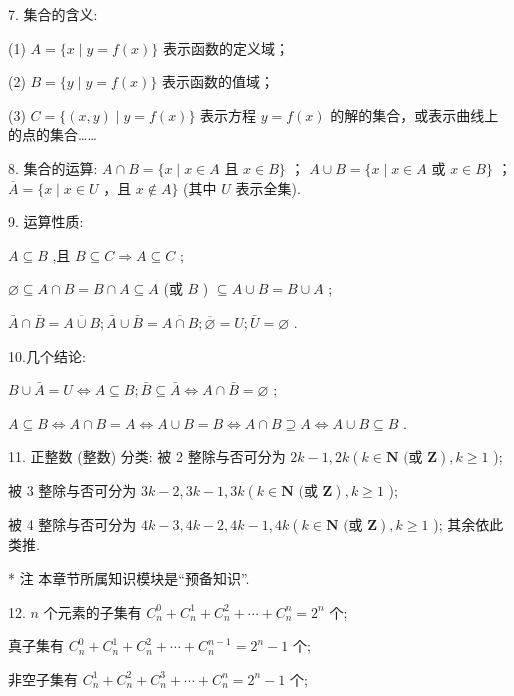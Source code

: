 7. 集合的含义:

(1) $A = \{ x \mid  y = f\left( x\right) \}$ 表示函数的定义域；

(2) $B = \{ y \mid  y = f\left( x\right) \}$ 表示函数的值域；

(3) $C = \{ \left( {x,y}\right)  \mid  y = f\left( x\right) \}$ 表示方程 $y = f\left( x\right)$ 的解的集合，或表示曲线上的点的集合……

8. 集合的运算: $A \cap  B = \{ x \mid  x \in  A$ 且 $x \in  B\}$ ； $A \cup  B = \{ x \mid  x \in  A$ 或 $x \in  B\}$ ； $\overline{A} = \{ x \mid  x \in  U$ ，且 $x \notin  A\}$ (其中 $U$ 表示全集).

9. 运算性质:

$A \subseteq  B$ ,且 $B \subseteq  C \Rightarrow  A \subseteq  C$ ;

$\varnothing  \subseteq  A \cap  B = B \cap  A \subseteq  A$ (或 $B$ ) $\subseteq  A \cup  B = B \cup  A$ ;

$\bar{A} \cap  \bar{B} = \overline{A \cup  B};\bar{A} \cup  \bar{B} = \overline{A \cap  B};\overline{\varnothing } = U;\bar{U} = \varnothing$ .

10.几个结论:

$B \cup  \bar{A} = U \Leftrightarrow  A \subseteq  B;\bar{B} \subseteq  \bar{A} \Leftrightarrow  A \cap  \bar{B} = \varnothing$ ;

$A \subseteq  B \Leftrightarrow  A \cap  B = A \Leftrightarrow  A \cup  B = B \Leftrightarrow  A \cap  B \supseteq  A \Leftrightarrow  A \cup  B \subseteq  B$ .

11. 正整数 (整数) 分类: 被 2 整除与否可分为 ${2k} - 1,{2k}\left( {k \in  \mathbf{N}\text{ (或 }\mathbf{Z}}\right) ,k \geq  1$ );

被 3 整除与否可分为 ${3k} - 2,{3k} - 1,{3k}\left( {k \in  \mathbf{N}\text{ (或 }\mathbf{Z}}\right) ,k \geq  1$ );

被 4 整除与否可分为 ${4k} - 3,{4k} - 2,{4k} - 1,{4k}\left( {k \in  \mathbf{N}\text{ (或 }\mathbf{Z}}\right) ,k \geq  1$ ); 其余依此类推.

\HRule

* 注 本章节所属知识模块是“预备知识”.

\HRule

12. $n$ 个元素的子集有 ${{C}}_{n}^{0} + {{C}}_{n}^{1} + {{C}}_{n}^{2} + \cdots  + {{C}}_{n}^{n} = {2}^{n}$ 个;

真子集有 ${{C}}_{n}^{0} + {{C}}_{n}^{1} + {{C}}_{n}^{2} + \cdots  + {{C}}_{n}^{n - 1} = {2}^{n} - 1$ 个;

非空子集有 ${{C}}_{n}^{1} + {{C}}_{n}^{2} + {{C}}_{n}^{3} + \cdots  + {{C}}_{n}^{n} = {2}^{n} - 1$ 个;

